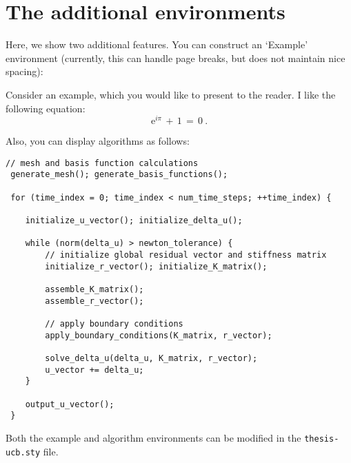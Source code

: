%
%

\section{The additional environments} \label{sec_additional_environments}

Here, we show two additional features.  
You can construct an `Example' environment (currently, this can handle page breaks, but does not maintain nice spacing):

\begin{example}
	Consider an example, which you would like to present to the reader.
	I like the following equation:
	\begin{equation*}
		\mathrm{e}^{i \pi}
		\, + \, 1
		\, = \, 0
		~.
	\end{equation*}
\end{example}


\noindent Also, you can display algorithms as follows:

\begin{lstlisting}[caption={\texttt{C++} pseudocode of an algorithm}]
 // mesh and basis function calculations
 generate_mesh(); generate_basis_functions();

 for (time_index = 0; time_index < num_time_steps; ++time_index) {

	initialize_u_vector(); initialize_delta_u();

	while (norm(delta_u) > newton_tolerance) {
		// initialize global residual vector and stiffness matrix
		initialize_r_vector(); initialize_K_matrix();

		assemble_K_matrix();
		assemble_r_vector();

		// apply boundary conditions
		apply_boundary_conditions(K_matrix, r_vector);

		solve_delta_u(delta_u, K_matrix, r_vector);
		u_vector += delta_u;
	}

	output_u_vector();
 }
\end{lstlisting}

\noindent Both the example and algorithm environments can be modified in the \texttt{thesis-ucb.sty} file.
\newpage



